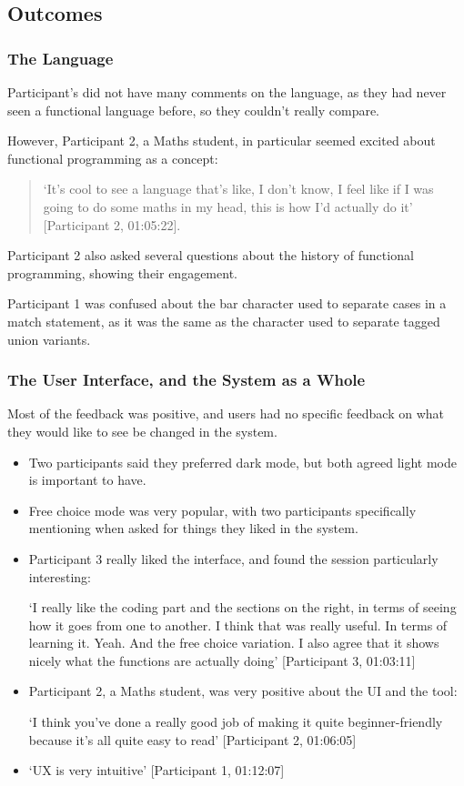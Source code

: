 \subsection{Outcomes}

\subsubsection{The Language}
Participant's did not have many comments on the language, as they had never seen a functional language before, so they couldn't really compare. 

However, Participant 2, a Maths student, in particular seemed excited about functional programming as a concept:
\begin{quotation}
\noindent `It's cool to see a language that's like, I don't know, I feel like if I was going to do some maths in my head, this is how I'd actually do it' [Participant 2, 01:05:22]. 
\end{quotation}
\noindent Participant 2 also asked several questions about the history of functional programming, showing their engagement. 

Participant 1 was confused about the bar character used to separate cases in a match statement, as it was the same as the character used to separate tagged union variants. 

\subsubsection{The User Interface, and the System as a Whole}
Most of the feedback was positive, and users had no specific feedback on what they would like to see be changed in the system. 

\begin{itemize}
    \item Two participants said they preferred dark mode, but both agreed light mode is important to have.
    
    \item Free choice mode was very popular, with two participants specifically mentioning when asked for things they liked in the system. 

    \item Participant 3 really liked the interface, and found the session particularly interesting:
    
    `I really like the coding part and the sections on the right, in terms of seeing how it goes from one to another. I think that was really useful. In terms of learning it. Yeah. And the free choice variation. I also agree that it shows nicely what the functions are actually doing' [Participant 3, 01:03:11]

    \item Participant 2, a Maths student, was very positive about the UI and the tool:
    
    `I think you've done a really good job of making it quite beginner-friendly because it's all quite easy to read' [Participant 2, 01:06:05]

    \item `UX is very intuitive' [Participant 1, 01:12:07]
\end{itemize}

